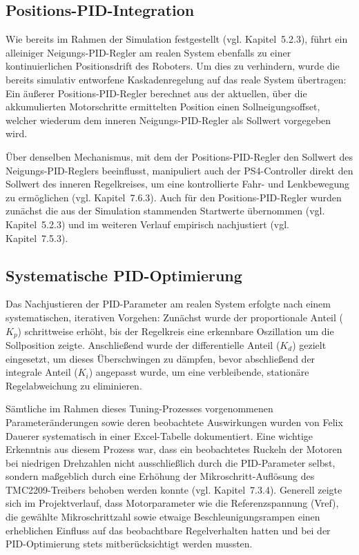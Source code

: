 \documentclass[12pt,ngerman,numbers=noenddot,abstracton,headsepline]{scrreprt}
\begin{document}
\subsection{Positions-PID-Integration}
\label{subsec:positions_pid_integration}

Wie bereits im Rahmen der Simulation festgestellt (vgl. Kapitel~5.2.3), führt ein alleiniger Neigungs-PID-Regler am realen System ebenfalls zu einer kontinuierlichen Positionsdrift des Roboters. Um dies zu verhindern, wurde die bereits simulativ entworfene Kaskadenregelung auf das reale System übertragen: Ein äußerer Positions-PID-Regler berechnet aus der aktuellen, über die akkumulierten Motorschritte ermittelten Position einen Sollneigungsoffset, welcher wiederum dem inneren Neigungs-PID-Regler als Sollwert vorgegeben wird.

Über denselben Mechanismus, mit dem der Positions-PID-Regler den Sollwert des Neigungs-PID-Reglers beeinflusst, manipuliert auch der PS4-Controller direkt den Sollwert des inneren Regelkreises, um eine kontrollierte Fahr- und Lenkbewegung zu ermöglichen (vgl. Kapitel~7.6.3). Auch für den Positions-PID-Regler wurden zunächst die aus der Simulation stammenden Startwerte übernommen (vgl. Kapitel~5.2.3) und im weiteren Verlauf empirisch nachjustiert (vgl. Kapitel~7.5.3).

\subsection{Systematische PID-Optimierung}
\label{subsec:pid_optimierung}

Das Nachjustieren der PID-Parameter am realen System erfolgte nach einem systematischen, iterativen Vorgehen: Zunächst wurde der proportionale Anteil ($K_p$) schrittweise erhöht, bis der Regelkreis eine erkennbare Oszillation um die Sollposition zeigte. Anschließend wurde der differentielle Anteil ($K_d$) gezielt eingesetzt, um dieses Überschwingen zu dämpfen, bevor abschließend der integrale Anteil ($K_i$) angepasst wurde, um eine verbleibende, stationäre Regelabweichung zu eliminieren.

Sämtliche im Rahmen dieses Tuning-Prozesses vorgenommenen Parameteränderungen sowie deren beobachtete Auswirkungen wurden von Felix Dauerer systematisch in einer Excel-Tabelle dokumentiert. Eine wichtige Erkenntnis aus diesem Prozess war, dass ein beobachtetes Ruckeln der Motoren bei niedrigen Drehzahlen nicht ausschließlich durch die PID-Parameter selbst, sondern maßgeblich durch eine Erhöhung der Mikroschritt-Auflösung des TMC2209-Treibers behoben werden konnte (vgl. Kapitel~7.3.4). Generell zeigte sich im Projektverlauf, dass Motorparameter wie die Referenzspannung (Vref), die gewählte Mikroschrittzahl sowie etwaige Beschleunigungsrampen einen erheblichen Einfluss auf das beobachtbare Regelverhalten hatten und bei der PID-Optimierung stets mitberücksichtigt werden mussten.
\end{document}
